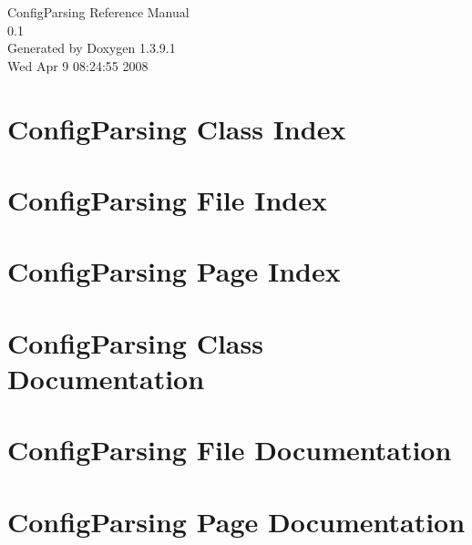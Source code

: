 \documentclass[a4paper]{book}
\begin{document}
\begin{titlepage}
\vspace*{7cm}
\begin{center}
{\Large Config\-Parsing Reference Manual\\[1ex]\large 0.1 }\\
\vspace*{1cm}
{\large Generated by Doxygen 1.3.9.1}\\
\vspace*{0.5cm}
{\small Wed Apr 9 08:24:55 2008}\\
\end{center}
\end{titlepage}
\clearemptydoublepage
{}
\tableofcontents
\clearemptydoublepage
{}
\chapter{Config\-Parsing Class Index}

\chapter{Config\-Parsing File Index}

\chapter{Config\-Parsing Page Index}

\chapter{Config\-Parsing Class Documentation}






\chapter{Config\-Parsing File Documentation}








\chapter{Config\-Parsing Page Documentation}

\printindex
\end{document}
